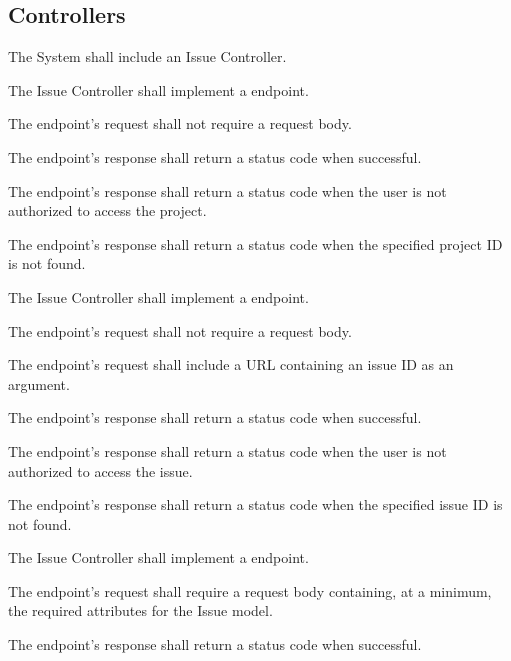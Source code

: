 \documentclass[12pt]{report}
\begin{document}
	\subsection{Controllers}
		\begin{reqlist}
			\item The System shall include an Issue Controller.
				\begin{reqlist}
					\item The Issue Controller shall implement a  endpoint.
					\begin{reqlist}
						\item The endpoint's request shall not require a request body.
						\item The endpoint's response shall return a  status code when successful.
						\item The endpoint's response shall return a  status code when the user is not authorized to access the project.
						\item The endpoint's response shall return a  status code when the specified project ID is not found.
					\end{reqlist}
					\item The Issue Controller shall implement a \code{GET:id} endpoint.
					\begin{reqlist}
						\item The endpoint's request shall not require a request body.
						\item The endpoint's request shall include a URL containing an issue ID as an argument.
						\item The endpoint's response shall return a  status code when successful.
						\item The endpoint's response shall return a  status code when the user is not authorized to access the issue.
						\item The endpoint's response shall return a  status code when the specified issue ID is not found.
					\end{reqlist}
					\item The Issue Controller shall implement a \code{POST} endpoint.
					\begin{reqlist}
						\item The endpoint's request shall require a request body containing, at a minimum, the required attributes for the Issue model.
						\item The endpoint's response shall return a  status code when successful.

\end{reqlist}
\end{reqlist}
\end{reqlist}
\end{document}
